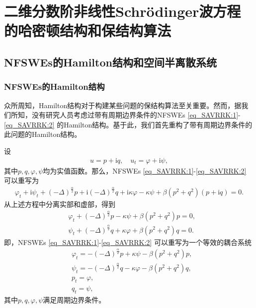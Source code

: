 \chapter[二维分数阶非线性Schr{\"o}dinger波方程的哈密顿结构和保结构算法]{二维分数阶非线性Schr{\"o}dinger波方程的哈密顿结构和保结构算法}

\section{NFSWEs的Hamilton结构和空间半离散系统}\label{Section_PAVF: 2}
\subsection{NFSWEs的Hamilton结构}
众所周知，Hamilton结构对于构建某些问题的保结构算法至关重要。然而，据我们所知，没有研究人员考虑过带有周期边界条件的NFSWEs \eqref{eq_SAVRRK:1}-\eqref{eq_SAVRRK:2} 的Hamilton结构。基于此，我们首先重构了带有周期边界条件的此问题的Hamilton结构。

设
\begin{align}
u = p+\mathrm{i}q, \quad u_t = \varphi+ \mathrm{i}\psi,
\end{align}
其中$p, q,\varphi,\psi$均为实值函数。那么，NFSWEs \eqref{eq_SAVRRK:1}-\eqref{eq_SAVRRK:2} 可以重写为
\begin{align}\label{eq_PAVF:28}
\varphi_{t}+\mathrm{i}\psi_{t}+\left( -\Delta \right) ^{\frac{\alpha }{2}}p+\mathrm{i}\left( -\Delta \right) ^{\frac{\alpha }{2}}q+\mathrm{i}\kappa \varphi-\kappa \psi+\beta \left( p^{2}+q^{2}\right) \left( p+\mathrm{i} q\right) =0.
\end{align}
从上述方程中分离实部和虚部，得到
\begin{align}
&\varphi_{t}+\left( -\Delta \right) ^{\frac{\alpha }{2}}p-\kappa \psi+\beta \left( p^{2}+q^{2}\right)p=0,\nonumber\\
&\psi_{t}+\left( -\Delta \right) ^{\frac{\alpha }{2}}q+\kappa \varphi+\beta \left( p^{2}+q^{2}\right)q=0.\label{eq_PAVF:29}
\end{align}
即，NFSWEs \eqref{eq_SAVRRK:1}-\eqref{eq_SAVRRK:2} 可以重写为一个等效的耦合系统
\begin{align}
&\varphi_{t}=-\left( -\Delta \right) ^{\frac{\alpha }{2}}p+\kappa \psi-\beta \left( p^{2}+q^{2}\right)p\label{eq_PAVF:30},\\
&\psi_{t}=-\left( -\Delta \right) ^{\frac{\alpha }{2}}q-\kappa \varphi-\beta \left( p^{2}+q^{2}\right)q\label{eq_PAVF:31},\\
&p_t=\varphi, \label{eq_PAVF:32}\\
&q_t=\psi, \label{eq_PAVF:33}
\end{align}
其中$p, q,\varphi,\psi$满足周期边界条件。

